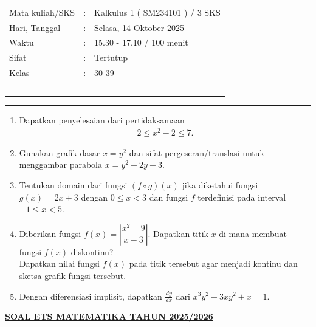 \documentclass[10pt,openany,a4paper]{article}
\theoremstyle{definition}
\theoremstyle{definition}
\theoremstyle{plain}
\begin{document}
    \begin{center}
	\begin{tabular}{lcl}
		Mata kuliah/SKS & : & Kalkulus 1 ( SM234101 ) / 3 SKS\\
		Hari, Tanggal & : & Selasa, 14 Oktober 2025\\
		Waktu & : & 15.30 - 17.10 / 100 menit\\
		Sifat & : & Tertutup\\
		Kelas & : & 30-39\\
  ~
	\end{tabular}
    
    \noindent\rule{\textwidth}{2.pt}
        \end{center}
        \begin{enumerate}
            \item Dapatkan penyelesaian dari pertidaksamaan 
            \begin{align*}
                2\leq x^2-2\leq 7.
            \end{align*}
            \item Gunakan grafik dasar $x=y^2$ dan sifat pergeseran/translasi untuk menggambar parabola $x=y^2+2y+3$.
            \item Tentukan domain dari fungsi $(f\circ g)(x)$ jika diketahui fungsi $g(x)=2x+3$ dengan $0\leq x<3$ dan fungsi $f$ terdefinisi pada interval $-1\leq x <5$.
            \item Diberikan fungsi $f(x)=\left|\dfrac{x^2-9}{x-3}\right|$. Dapatkan titik $x$ di mana membuat fungsi $f(x)$ diskontinu?\\
            Dapatkan nilai fungsi $f(x)$ pada titik tersebut agar menjadi kontinu dan sketsa grafik fungsi tersebut.
            \item Dengan diferensiasi implisit, dapatkan $\frac{dy}{dx}$ dari $x^3y^2-3xy^2+x=1$.
        \end{enumerate}
 \newpage
 \begin{center}
	{\underline{\textbf{\MakeUppercase{Soal ETS Matematika Tahun 2025/2026}}}}
    \end{center}
\end{document}
